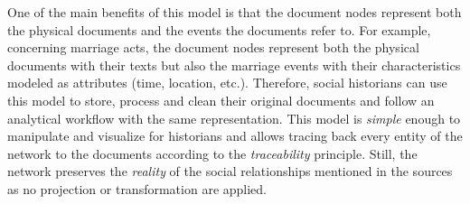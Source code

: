 One of the main benefits of this model is that the document nodes represent both the physical documents and the events the documents refer to.
For example, concerning marriage acts, the document nodes represent both the physical documents with their texts but also the marriage events with their characteristics modeled as attributes (time, location, etc.).
Therefore, social historians can use this model to store, process and clean their original documents and follow an analytical workflow with the same representation.
This model is \textit{simple} enough to manipulate and visualize for historians and allows tracing back every entity of the network to the documents according to the \textit{traceability} principle.
Still, the network preserves the \textit{reality} of the social relationships mentioned in the sources as no projection or transformation are applied.





